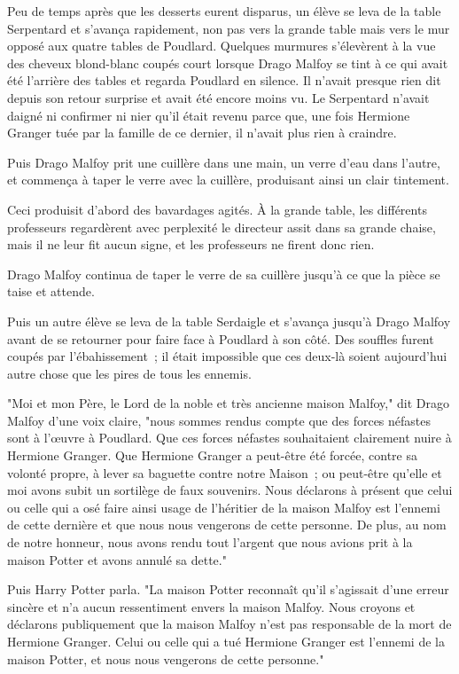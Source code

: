 Peu de temps après que les desserts eurent disparus, un élève se leva de la table Serpentard et s'avança rapidement, non pas vers la grande table mais vers le mur opposé aux quatre tables de Poudlard. Quelques murmures s'élevèrent à la vue des cheveux blond-blanc coupés court lorsque Drago Malfoy se tint à ce qui avait été l'arrière des tables et regarda Poudlard en silence. Il n'avait presque rien dit depuis son retour surprise et avait été encore moins vu. Le Serpentard n'avait daigné ni confirmer ni nier qu'il était revenu parce que, une fois Hermione Granger tuée par la famille de ce dernier, il n'avait plus rien à craindre.

Puis Drago Malfoy prit une cuillère dans une main, un verre d'eau dans l'autre, et commença à taper le verre avec la cuillère, produisant ainsi un clair tintement.

Ceci produisit d'abord des bavardages agités. À la grande table, les différents professeurs regardèrent avec perplexité le directeur assit dans sa grande chaise, mais il ne leur fit aucun signe, et les professeurs ne firent donc rien.

Drago Malfoy continua de taper le verre de sa cuillère jusqu'à ce que la pièce se taise et attende.

Puis un autre élève se leva de la table Serdaigle et s'avança jusqu'à Drago Malfoy avant de se retourner pour faire face à Poudlard à son côté. Des souffles furent coupés par l'ébahissement~; il était impossible que ces deux-là soient aujourd'hui autre chose que les pires de tous les ennemis.

"Moi et mon Père, le Lord de la noble et très ancienne maison Malfoy," dit Drago Malfoy d'une voix claire, "nous sommes rendus compte que des forces néfastes sont à l'œuvre à Poudlard. Que ces forces néfastes souhaitaient clairement nuire à Hermione Granger. Que Hermione Granger a peut-être été forcée, contre sa volonté propre, à lever sa baguette contre notre Maison~; ou peut-être qu'elle et moi avons subit un sortilège de faux souvenirs. Nous déclarons à présent que celui ou celle qui a osé faire ainsi usage de l'héritier de la maison Malfoy est l'ennemi de cette dernière et que nous nous vengerons de cette personne. De plus, au nom de notre honneur, nous avons rendu tout l'argent que nous avions prit à la maison Potter et avons annulé sa dette."

Puis Harry Potter parla. "La maison Potter reconnaît qu'il s'agissait d'une erreur sincère et n'a aucun ressentiment envers la maison Malfoy. Nous croyons et déclarons publiquement que la maison Malfoy n'est pas responsable de la mort de Hermione Granger. Celui ou celle qui a tué Hermione Granger est l'ennemi de la maison Potter, et nous nous vengerons de cette personne."

